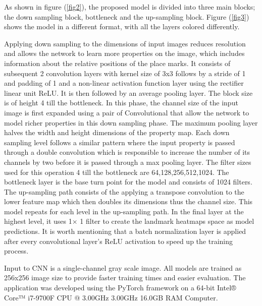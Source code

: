 \documentclass{elektr}
\begin{document}

As shown in figure (\ref{fig2}), the proposed model is divided into three main blocks; the down sampling block, bottleneck and the up-sampling block. Figure (\ref{fig3}) shows the model in a different format, with all the layers colored differently. 

Applying down sampling to the dimensions of input images reduces resolution and allows the network to learn more properties on the image, which includes information about the relative positions of the place marks. It consists of subsequent 2 convolution layers with kernel size of 3x3 follows by a stride of 1 and padding of 1 and a non-linear activation function layer using the rectifier linear unit ReLU. It is then followed by an average pooling layer. The block size is of height 4 till the bottleneck. In this phase, the channel size of the input image is first expanded using a pair of Convolutional that allow the network to model richer properties in this down sampling phase. The maximum pooling layer halves the width and height dimensions of the property map. Each down sampling level follows a similar pattern where the input property is passed through a double convolution which is responsible to increase the number of its channels by two before it is passed through a max pooling layer. The filter sizes used for this operation 4 till the bottleneck are 64,128,256,512,1024. The bottleneck layer is the base turn point for the model and consists of 1024 filters. The up-sampling path consists of the applying a transpose convolution to the lower feature map which then doubles its dimensions thus the channel size. This model repeats for each level in the up-sampling path. In the final layer at the highest level, it uses 1$ \times $ 1 filter to create the landmark heatmaps space as model predictions. It is worth mentioning that a batch normalization layer is applied after every convolutional layer’s ReLU activation to speed up the training process. 

Input to CNN is a single-channel gray scale image. All models are trained as 256x256 image size to provide faster training times and easier evaluation. The application was developed using the PyTorch \cite{ref12} framework on a 64-bit Intel® Core™ i7-9700F CPU @ 3.00GHz 3.00GHz 16.0GB RAM Computer. 


\end{document}
